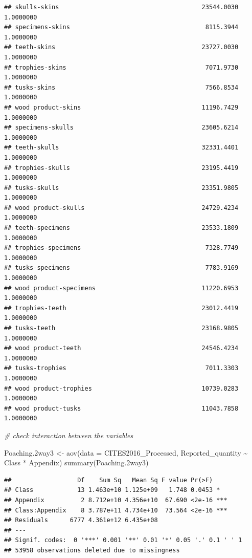 \documentclass[
  12pt,
]{article}
\newenvironment{Shaded}{\begin{snugshade}}{\end{snugshade}}
\newcommand{\AttributeTok}[1]{\textcolor[rgb]{0.77,0.63,0.00}{#1}}
\newcommand{\CommentTok}[1]{\textcolor[rgb]{0.56,0.35,0.01}{\textit{#1}}}
\newcommand{\FloatTok}[1]{\textcolor[rgb]{0.00,0.00,0.81}{#1}}
\newcommand{\FunctionTok}[1]{\textcolor[rgb]{0.00,0.00,0.00}{#1}}
\newcommand{\NormalTok}[1]{#1}
\newcommand{\OtherTok}[1]{\textcolor[rgb]{0.56,0.35,0.01}{#1}}
\newcommand{\SpecialCharTok}[1]{\textcolor[rgb]{0.00,0.00,0.00}{#1}}
\begin{document}
\begin{verbatim}
## skulls-skins                                       23544.0030 1.0000000
## specimens-skins                                     8115.3944 1.0000000
## teeth-skins                                        23727.0030 1.0000000
## trophies-skins                                      7071.9730 1.0000000
## tusks-skins                                         7566.8534 1.0000000
## wood product-skins                                 11196.7429 1.0000000
## specimens-skulls                                   23605.6214 1.0000000
## teeth-skulls                                       32331.4401 1.0000000
## trophies-skulls                                    23195.4419 1.0000000
## tusks-skulls                                       23351.9805 1.0000000
## wood product-skulls                                24729.4234 1.0000000
## teeth-specimens                                    23533.1809 1.0000000
## trophies-specimens                                  7328.7749 1.0000000
## tusks-specimens                                     7783.9169 1.0000000
## wood product-specimens                             11220.6953 1.0000000
## trophies-teeth                                     23012.4419 1.0000000
## tusks-teeth                                        23168.9805 1.0000000
## wood product-teeth                                 24546.4234 1.0000000
## tusks-trophies                                      7011.3303 1.0000000
## wood product-trophies                              10739.0283 1.0000000
## wood product-tusks                                 11043.7858 1.0000000
\end{verbatim}

\begin{Shaded}
\begin{Highlighting}[]
\CommentTok{\# check interaction between the variables}

\NormalTok{Poaching}\FloatTok{.2}\NormalTok{way3 }\OtherTok{\textless{}{-}} \FunctionTok{aov}\NormalTok{(}\AttributeTok{data =}\NormalTok{ CITES2016\_Processed, Reported\_quantity }\SpecialCharTok{\textasciitilde{}}\NormalTok{ Class }\SpecialCharTok{*}\NormalTok{ Appendix)}
\FunctionTok{summary}\NormalTok{(Poaching}\FloatTok{.2}\NormalTok{way3)}
\end{Highlighting}
\end{Shaded}

\begin{verbatim}
##                  Df    Sum Sq   Mean Sq F value Pr(>F)    
## Class            13 1.463e+10 1.125e+09   1.748 0.0453 *  
## Appendix          2 8.712e+10 4.356e+10  67.690 <2e-16 ***
## Class:Appendix    8 3.787e+11 4.734e+10  73.564 <2e-16 ***
## Residuals      6777 4.361e+12 6.435e+08                   
## ---
## Signif. codes:  0 '***' 0.001 '**' 0.01 '*' 0.05 '.' 0.1 ' ' 1
## 53958 observations deleted due to missingness
\end{verbatim}
\end{document}
